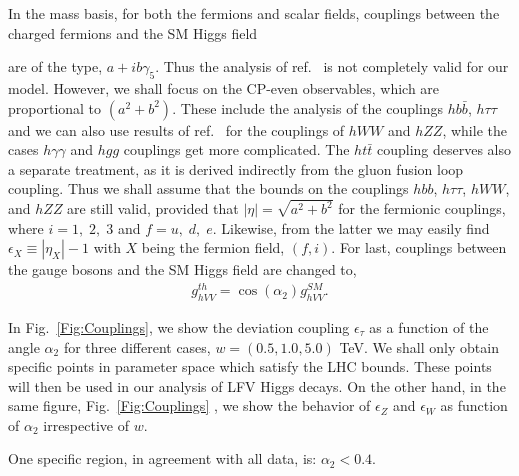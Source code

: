 \documentclass[aps,prd,groupaddress,floatfix,tighten,nofootinbib,showpacs,
amsfonts,superscriptaddress]{revtex4}
\begin{document}
In the mass basis, for both the fermions and scalar fields, couplings between the charged fermions and the SM Higgs field {are of the type, $a+ib\gamma_5$. Thus the analysis of ref.~\cite{Giardino:2013bma} is not completely valid for our model. However, we shall focus on the CP-even observables, which are proportional to $(a^2 + b^2)$. These include the analysis of the couplings $hb\bar{b}$, $h\tau \tau$ and we can also use results of ref.~\cite{Giardino:2013bma} for the couplings of $hWW$ and $hZZ$, while the cases $h\gamma \gamma$ and $hgg$ couplings get more complicated. The $ht\bar{t}$ coupling deserves also a separate treatment, as it is derived indirectly from the gluon fusion loop coupling. Thus we shall assume that the bounds on the couplings $hbb$, $h\tau\tau$, $hWW$, and $hZZ$ are still valid, provided that $|\eta| = \sqrt{a^2 + b^2}$ for the fermionic couplings,
where $i = 1,\; 2,\; 3$ and $f= u,\; d,\; e$. Likewise, from the latter we may easily
find $\epsilon_X \equiv |\eta_X| - 1$ with $X$ being the fermion field, $(f,i)$.  For last, couplings between the gauge bosons and the SM Higgs field are changed to,
\begin{eqnarray}
	g_{hVV}^{th} = \cos (\alpha_2) g_{hVV}^{SM}.
\end{eqnarray}


In Fig.~\ref{Fig:Couplings}, we show the deviation coupling $\epsilon_\tau$ as a function of the angle $\alpha_2$  
for three different cases, $w = (0.5, 1.0, 5.0)$ TeV.  
We shall only obtain specific points in parameter space 
which satisfy the LHC bounds. These points will then be used in our analysis of LFV Higgs decays. 
On the other hand, in the same figure, Fig.~\ref{Fig:Couplings} , we show
the behavior of $\epsilon_Z$ and $\epsilon_W$ as function of $\alpha_2$ irrespective of $w$. 

One specific region, in agreement with all data, is: $\alpha_2 < 0.4$.

}
\end{document}
